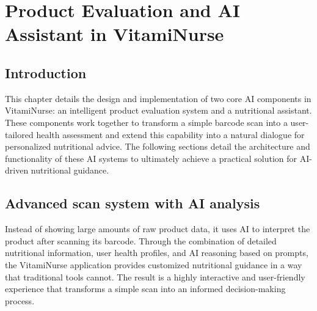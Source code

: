 

\chapter{Product Evaluation and AI Assistant in VitamiNurse}
\section*{Introduction}
This chapter details the design and implementation of two core AI components in VitamiNurse: an intelligent product evaluation system and a nutritional assistant.
These components work together to transform a simple barcode scan into a user-tailored health assessment and extend this capability into a natural dialogue for personalized nutritional advice. 
The following sections detail the architecture and functionality of these AI systems to ultimately achieve a practical solution for AI-driven nutritional guidance.

\section{Advanced scan system with AI analysis }
Instead of showing large amounts of raw product data, it uses AI to interpret the product after scanning its barcode.  Through the combination of detailed nutritional information, user health profiles, and AI reasoning based on prompts, the VitamiNurse application provides customized nutritional guidance in a way that traditional tools cannot. The result is a highly interactive and user-friendly experience that transforms a simple scan into an informed decision-making process.

